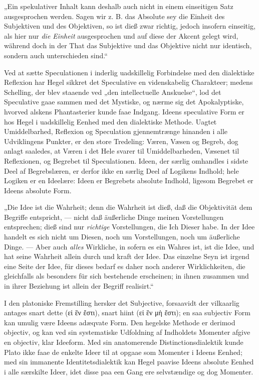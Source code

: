 \documentclass[12pt]{book}
\newcommand{\opage}[1]{\marginnote{\footnotesize\textit{[#1]}}}
\begin{document}
„Ein spekulativer Inhalt kann deshalb auch nicht in einem einseitigen Satz ausgesprochen werden.
Sagen wir z. B. das Absolute sey die Einheit des Subjektiven und des Objektiven, so ist dieß zwar
richtig, jedoch insofern einseitig, als hier nur \emph{die Einheit} ausgesprochen und auf diese
der Akcent gelegt wird, während doch in der That das Subjektive und das Objektive nicht nur
identisch, sondern auch unterschieden sind.“

Ved at sætte Speculationen i inderlig uadskillelig Forbindelse med den dialektiske Reflexion har
Hegel sikkret det Speculative en videnskabelig Charakteer; medens Schelling, der blev staaende ved
„den intellectuelle Anskuelse“, lod det Speculative gaae sammen med det Mystiske, og nærme sig det
Apokalyptiske, hvorved alskens Phantasterier kunde faae Indgang.
\opage{157} Ideens speculative Form er hos Hegel i uadskillelig Eenhed med den dialektiske Methode. Uagtet
Umiddelbarhed, Reflexion og Speculation gjennemtrænge hinanden i alle Udviklingens Punkter, er den
store Tredeling: Væren, Væsen og Begreb, dog anlagt saaledes, at Væren i det Hele svarer til
Umiddelbarheden, Væsenet til Reflexionen, og Begrebet til Speculationen. Ideen, der særlig
omhandles i sidste Deel af Begrebslæren, er derfor ikke en særlig Deel af Logikens Indhold; hele
Logiken er en Ideelære: Ideen er Begrebets absolute Indhold, ligesom Begrebet er Ideens absolute
Form.

„Die Idee ist die Wahrheit; denn die Wahrheit ist dieß, daß die Objektivität dem Begriffe
entspricht, — nicht daß äußerliche Dinge meinen Vorstellungen entsprechen; dieß sind nur
\emph{richtige} Vorstellungen, die Ich Dieser habe. In der Idee handelt es sich nicht um Diesen,
noch um Vorstellungen, noch um äußerliche Dinge. — Aber auch \emph{alles} Wirkliche, in sofern es
ein Wahres ist, ist die Idee, und hat seine Wahrheit allein durch und kraft der Idee. Das einzelne
Seyn ist irgend eine Seite der Idee, für dieses bedarf es daher noch anderer Wirklichkeiten, die
gleichfalls als besonders für sich bestehende erscheinen; in ihnen zusammen und in ihrer Beziehung
ist allein der Begriff realisirt.“

I den platoniske Fremstilling hersker det Subjective, forsaavidt der vilkaarlig antages snart
dette (εἰ ἓν ἔστι), snart hiint (εἰ ἓν μὴ ἔστι); en saa subjectiv Form kan umulig være Ideens
adæqvate Form. Den hegelske Methode er derimod objectiv, og kan ved sin systematiske Udfoldning af
Indholdets Momenter afgive en objectiv, klar Ideeform. Med sin anatomerende Distinctionsdialektik
kunde Plato ikke faae de enkelte Ideer til at opgaae som Momenter i Ideens Eenhed; med sin
immanente Identitetsdialektik kan Hegel paavise Ideens absolute Eenhed i alle særskilte Ideer, idet
disse paa een Gang ere selvstændige og dog Momenter.
\end{document}
